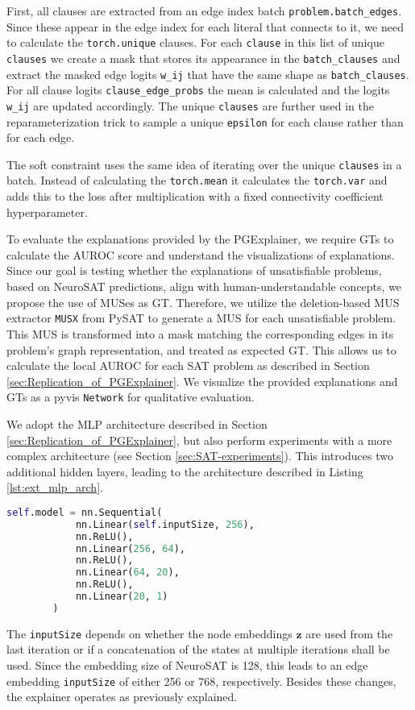 First, all clauses are extracted from an edge index batch \lstinline|problem.batch_edges|. Since these appear in the edge index for each literal that connects to it, we need to calculate the \lstinline|torch.unique| clauses. For each \lstinline|clause| in this list of unique \lstinline|clauses| we create a mask that stores its appearance in the \lstinline|batch_clauses| and extract the masked edge logits \lstinline|w_ij| that have the same shape as \lstinline|batch_clauses|. For all clause logits \lstinline|clause_edge_probs| the mean is calculated and the logits \lstinline|w_ij| are updated accordingly.
The unique \lstinline|clauses| are further used in the reparameterization trick to sample a unique \lstinline|epsilon| for each clause rather than for each edge.

The soft constraint uses the same idea of iterating over the unique \lstinline|clauses| in a batch. Instead of calculating the \lstinline|torch.mean| it calculates the \lstinline|torch.var| and adds this to the loss after multiplication with a fixed connectivity coefficient hyperparameter. \bigskip

To evaluate the explanations provided by the PGExplainer, we require \acp{GT} to calculate the AUROC score and understand the visualizations of explanations. Since our goal is testing whether the explanations of unsatisfiable problems, based on NeuroSAT predictions, align with human-understandable concepts, we propose the use of MUSes as \ac{GT}. Therefore, we utilize the deletion-based MUS extractor \lstinline|MUSX| from PySAT \cite{imms-sat18} to generate a MUS for each unsatisfiable problem. This MUS is transformed into a mask matching the corresponding edges in its problem's graph representation, and treated as expected \ac{GT}. This allows us to calculate the local AUROC for each SAT problem as described in Section \ref{sec:Replication_of_PGExplainer}. We visualize the provided explanations and \acp{GT} as a pyvis \cite{perrone2020network} \lstinline|Network| for qualitative evaluation. \bigskip

We adopt the MLP architecture described in Section \ref{sec:Replication_of_PGExplainer}, but also perform experiments with a more complex architecture (see Section \ref{sec:SAT-experiments}). This introduces two additional hidden layers, leading to the architecture described in Listing \ref{lst:ext_mlp_arch}.
\begin{lstlisting}[language=Python, caption=TODO: REMOVE? Implementation of extended MLP architecture., label=lst:ext_mlp_arch]
    self.model = nn.Sequential(
            nn.Linear(self.inputSize, 256),
            nn.ReLU(),
            nn.Linear(256, 64),
            nn.ReLU(),
            nn.Linear(64, 20),
            nn.ReLU(),
            nn.Linear(20, 1)
        )
\end{lstlisting}
The \lstinline|inputSize| depends on whether the node embeddings $\mathbf{z}$ are used from the last iteration or if a concatenation of the states at multiple iterations shall be used. Since the embedding size of NeuroSAT is 128, this leads to an edge embedding \lstinline|inputSize| of either 256 or 768, respectively. Besides these changes, the explainer operates as previously explained.